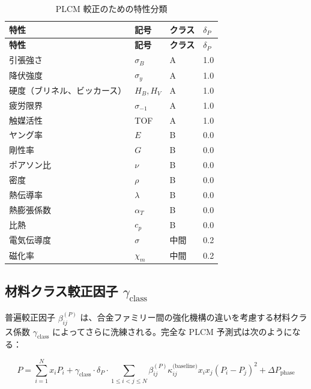 \documentclass[11pt,a4paper]{article}
\theoremstyle{remark}
\begin{document}
	\begin{longtable}{p{4cm}p{3cm}p{3cm}p{3cm}}
		\caption{PLCM 較正のための特性分類} \label{tab:property-classification} \\
		\toprule
		\textbf{特性} & \textbf{記号} & \textbf{クラス} & \(\delta_P\) \\
		\midrule
		\endfirsthead
		\toprule
		\textbf{特性} & \textbf{記号} & \textbf{クラス} & \(\delta_P\) \\
		\midrule
		\endhead
		引張強さ & \(\sigma_B\) & A & 1.0 \\
		降伏強度 & \(\sigma_y\) & A & 1.0 \\
		硬度（ブリネル、ビッカース） & \(H_B, H_V\) & A & 1.0 \\
		疲労限界 & \(\sigma_{-1}\) & A & 1.0 \\
		触媒活性 & TOF & A & 1.0 \\
		\hline
		ヤング率 & \(E\) & B & 0.0 \\
		剛性率 & \(G\) & B & 0.0 \\
		ポアソン比 & \(\nu\) & B & 0.0 \\
		密度 & \(\rho\) & B & 0.0 \\
		熱伝導率 & \(\lambda\) & B & 0.0 \\
		熱膨張係数 & \(\alpha_T\) & B & 0.0 \\
		比熱 & \(c_p\) & B & 0.0 \\
		\hline
		電気伝導度 & \(\sigma\) & 中間 & 0.2 \\
		磁化率 & \(\chi_m\) & 中間 & 0.2 \\
		\bottomrule
	\end{longtable}
	
	\subsection{材料クラス較正因子 \(\gamma_{\text{class}}\)}
	\label{subsec:material-class-factors}
	
	普遍較正因子 \(\beta_{ij}^{(P)}\) は、合金ファミリー間の強化機構の違いを考慮する材料クラス係数 \(\gamma_{\text{class}}\) によってさらに洗練される。完全な PLCM 予測式は次のようになる：
	
	\begin{equation}
		\boxed{P = \sum_{i=1}^{N} x_i P_i + \gamma_{\text{class}} \cdot \delta_P \cdot \sum_{1\le i<j\le N} \beta_{ij}^{(P)} \kappa_{ij}^{\text{(baseline)}} x_i x_j (P_i - P_j)^2 + \Delta P_{\text{phase}}}
		\label{eq:plcm-full-calibration}
	\end{equation}
	
\end{document}
